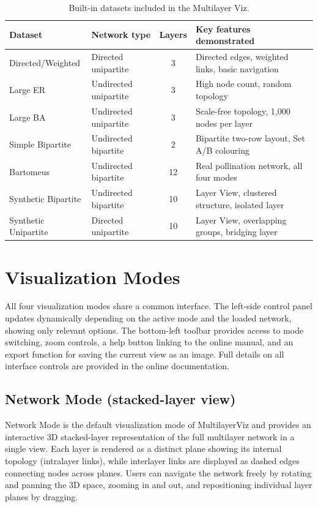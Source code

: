 \documentclass{article}
\begin{document}
\begin{table}[h]
\centering
\caption{Built-in datasets included in the Multilayer Viz.}
\label{tab:datasets}
\begin{tabular}{llcp{8cm}}
\hline
\textbf{Dataset} & \textbf{Network type} & \textbf{Layers} & \textbf{Key features demonstrated} \\
\hline
Directed/Weighted   & Directed unipartite   & 3  & Directed edges, weighted links, basic navigation \\
Large ER            & Undirected unipartite & 3  & High node count, random topology \\
Large BA            & Undirected unipartite & 3  & Scale-free topology, 1,000 nodes per layer \\
Simple Bipartite    & Undirected bipartite  & 2  & Bipartite two-row layout, Set A/B colouring \\
Bartomeus           & Undirected bipartite  & 12  & Real pollination network, all four modes \\
Synthetic Bipartite & Undirected bipartite  & 10 & Layer View, clustered structure, isolated layer \\
Synthetic Unipartite & Directed unipartite  & 10 & Layer View, overlapping groups, bridging layer \\
\hline
\end{tabular}
\end{table}

\section{Visualization Modes}

All four visualization modes share a common interface. The left-side control panel updates dynamically depending on the active mode and the loaded network, showing only relevant options. The bottom-left toolbar provides access to mode switching, zoom controls, a help button linking to the online manual, and an export function for saving the current view as an image. Full details on all interface controls are provided in the online documentation.

\subsection{Network Mode (stacked-layer view)}

Network Mode is the default visualization mode of MultilayerViz and provides an interactive 3D stacked-layer representation of the full multilayer network in a single view. Each layer is rendered as a distinct plane showing its internal topology (intralayer links), while interlayer links are displayed as dashed edges connecting nodes across planes. Users can navigate the network freely by rotating and panning the 3D space, zooming in and out, and repositioning individual layer planes by dragging. 
\end{document}
